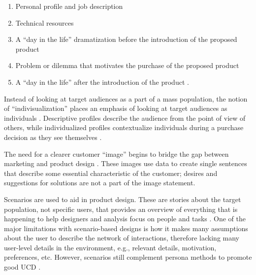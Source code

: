 \documentclass[010-intro.tex]{subfiles}
\begin{document}
        \begin{enumerate}
            \item Personal profile and job description
            \item Technical resources
            \item A ``day in the life'' dramatization before the introduction of the proposed product
            \item Problem or dilemma that motivates the purchase of the proposed product
            \item A ``day in the life'' after the introduction of the product
                \cite{mooreCrossingChasmMarketing1991, pruittPersonaLifecycleKeeping2006}.
        \end{enumerate}
    
        Instead of looking at target audiences as a part of a mass population,
        the notion of ``indivisualization'' places an emphasis of looking at target audiences as individuals
        \cite{upshawBuildingBrandIdentity1995, pruittPersonaLifecycleKeeping2006}.
        Descriptive profiles describe the audience from the point of view of others,
        while individualized profiles contextualize individuals during a purchase decision as they see themselves
        \cite{upshawBuildingBrandIdentity1995, pruittPersonaLifecycleKeeping2006}.
    
        The need for a clearer customer ``image'' begins to bridge the gap between marketing and product design
        \cite{melloCustomercentricProductDefinition2003, pruittPersonaLifecycleKeeping2006}.
        These images use data to create single sentences that describe some essential characteristic of the customer;
        desires and suggestions for solutions are not a part of the image statement.
    
        Scenarios are used to aid in product design.
        These are stories about the target population,
        not specific users,
        that provides an overview of everything that is happening to help designers and analysis focus on people and tasks
        \cite{carrollScenarioBasedDesignEnvisioning1995, pruittPersonaLifecycleKeeping2006}.
        One of the major limitations with scenario-based designs is how it makes many assumptions
        about the user to describe the network of interactions,
        therefore lacking many user-level details in the environment,
        e.g., relevant details, motivation, preferences, etc.
        However, scenarios still complement persona methods to promote good UCD
        \cite{mikkelsonIncorporatingUserArchetypes2000, pruittPersonaLifecycleKeeping2006}.
    
\end{document}
